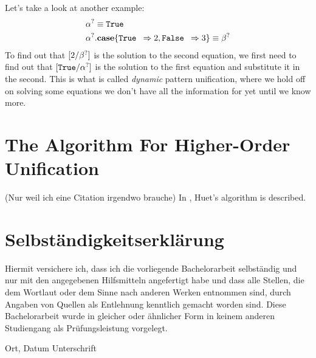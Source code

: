 \documentclass[twoside,12pt,a4paper]{article}
\begin{document}
Let's take a look at another example:
\begin{align*}
    &\alpha^? \equiv \texttt{True } \\
    &\alpha^?.\textbf{case}\{\texttt{True } \Rightarrow 2, \texttt{False } \Rightarrow 3\} \equiv \beta^?
\end{align*}
To find out that $[2/\beta^?]$ is the solution to the second equation, we first need to find out that
$[\texttt{True}/\alpha^?]$ is the solution to the first equation and substitute it in the second.
This is what is called \textit{dynamic} pattern unification, where we hold off on solving some equations we don't have all the information for yet until we know more. 

\section{The Algorithm For Higher-Order Unification}
(Nur weil ich eine Citation irgendwo brauche)
In \cite{DBLP:books/el/RV01/Dowek01}, Huet's algorithm is described. %









\cleardoublepage

\thispagestyle{empty}
\section*{Selbständigkeitserklärung}

Hiermit versichere ich, dass ich die vorliegende Bachelorarbeit 
selbständig und nur mit den angegebenen Hilfsmitteln angefertigt habe und dass alle Stellen, die dem Wortlaut oder dem 
Sinne nach anderen Werken entnommen sind, durch Angaben von Quellen als 
Entlehnung kenntlich gemacht worden sind. 
Diese Bachelorarbeit wurde in gleicher oder ähnlicher Form in keinem anderen 
Studiengang als Prüfungsleistung vorgelegt. 

\vskip 3cm

Ort, Datum	\hfill Unterschrift \hfill 


\end{document}

